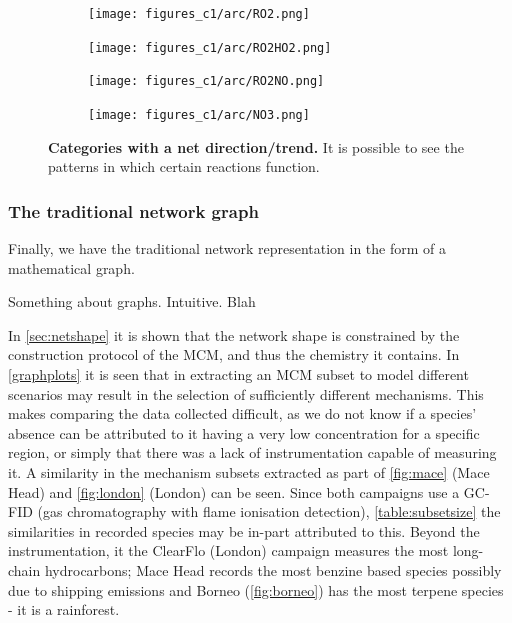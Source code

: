 \begin{figure}[H]
     \centering
      \begin{subfigure}[b]{.4\textwidth}
         \centering
         \texttt{[image: figures\_c1/arc/RO2.png]}
         \caption{ }
         \label{fig:ro2}
     \end{subfigure}
     \begin{subfigure}[b]{.4\textwidth}
        \centering
        \texttt{[image: figures\_c1/arc/RO2HO2.png]}
        \caption{}
        \label{fig:ro2ho2}
    \end{subfigure}
    \begin{subfigure}[b]{.4\textwidth}
       \centering
       \texttt{[image: figures\_c1/arc/RO2NO.png]}
       \caption{}
       \label{fig:ro2no}
   \end{subfigure}
   \begin{subfigure}[b]{.4\textwidth}
      \centering
      \texttt{[image: figures\_c1/arc/NO3.png]}
      \caption{ }
      \label{fig:no3}
  \end{subfigure}
\caption{\textbf{Categories with a net direction/trend.} It is possible to see the patterns in which certain reactions function.  }
  \label{fig:ro2arc}
\end{figure}



\subsubsection{The traditional network graph}

Finally, we have the traditional network representation in the form of a mathematical graph.

Something about graphs. Intuitive. Blah


In \autoref{sec:netshape} it is shown that the network shape is constrained by the construction protocol of the MCM, and thus the chemistry it contains. In \autoref{graphplots} it is seen that in extracting an MCM subset to model different scenarios may result in the selection of sufficiently different mechanisms. This makes comparing the data collected difficult, as we do not know if a species' absence can be attributed to it having a very low concentration for a specific region, or simply that there was a lack of instrumentation capable of measuring it. A similarity in the mechanism subsets extracted as part of \autoref{fig:mace} (Mace Head) and \autoref{fig:london} (London) can be seen. Since both campaigns use a GC-FID (gas
chromatography with flame ionisation detection), \autoref{table:subsetsize} the similarities in recorded species may be in-part attributed to this. Beyond the instrumentation, it the ClearFlo (London) campaign measures the most long-chain hydrocarbons; Mace Head records the most benzine based species possibly due to shipping emissions and Borneo (\autoref{fig:borneo}) has the most terpene species - it is a rainforest.



